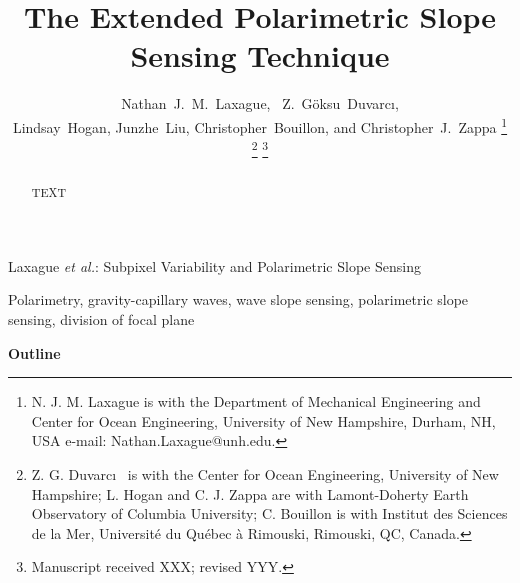 \documentclass[letterpaper,journal]{IEEEtran}
\begin{document}
%
\title{The Extended Polarimetric Slope Sensing Technique}

\author{Nathan~J.~M.~Laxague,~
        Z.~G\"oksu~Duvarc\i,\\
        Lindsay~Hogan, Junzhe~Liu,
        Christopher~Bouillon, and Christopher~J.~Zappa%
\thanks{N. J. M. Laxague is with the Department
of Mechanical Engineering and Center for Ocean Engineering, University of New Hampshire, Durham, NH, USA e-mail: Nathan.Laxague@unh.edu.}%
\thanks{Z. G. Duvarc\i~ is with the Center for Ocean Engineering, University of New Hampshire; L. Hogan and C. J. Zappa are with Lamont-Doherty Earth Observatory of Columbia University; C. Bouillon is with Institut des Sciences de la Mer, Université du Québec à Rimouski, Rimouski, QC, Canada.}%
\thanks{Manuscript received XXX; revised YYY.}}

%
{Laxague \MakeLowercase{\textit{et al.}}: Subpixel Variability and Polarimetric Slope Sensing}

\maketitle

\begin{abstract}
TEXT

\end{abstract}

\begin{IEEEkeywords}
Polarimetry, gravity-capillary waves, wave slope sensing, polarimetric slope sensing, division of focal plane
\end{IEEEkeywords}

\IEEEpeerreviewmaketitle

\textbf{Outline}
\end{document}
